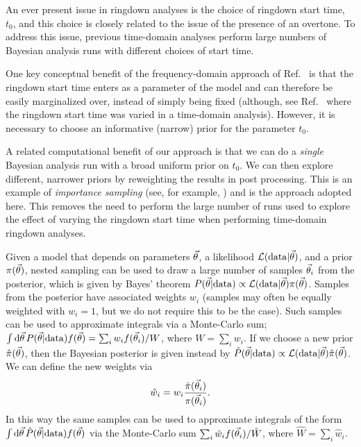 An ever present issue in ringdown analyses is the choice of ringdown start time, $t_0$, and this choice is closely related to the issue of the presence of an overtone.
To address this issue, previous time-domain analyses \cite{Isi:2019aib, Cotesta:2022pci, Isi:2022mhy} perform large numbers of Bayesian analysis runs with different choices of start time.

One key conceptual benefit of the frequency-domain approach of Ref.~\cite{Finch:2021qph} is that the ringdown start time enters as a parameter of the model and can therefore be easily marginalized over, instead of simply being fixed (although, see Ref.~\cite{Carullo:2019flw} where the ringdown start time was varied in a time-domain analysis). 
However, it is necessary to choose an informative (narrow) prior for the parameter $t_0$.

A related computational benefit of our approach is that we can do a \emph{single} Bayesian analysis run with a broad uniform prior on $t_0$. We can then explore different, narrower priors by reweighting the results in post processing. 
This is an example of \emph{importance sampling} (see, for example, \cite{RobertChristian2013MCsm}) and is the approach adopted here.
This removes the need to perform the large number of runs used to explore the effect of varying the ringdown start time when performing time-domain ringdown analyses.

Given a model that depends on parameters $\vec{\theta}$, a likelihood $\mathcal{L}(\mathrm{data}|\vec{\theta})$, and a prior $\pi(\vec{\theta})$, nested sampling can be used to draw a large number of samples $\vec{\theta}_i$ from the posterior, which is given by Bayes' theorem $P(\vec{\theta}|\mathrm{data})\propto \mathcal{L}(\mathrm{data}|\vec{\theta}) \pi(\vec{\theta})$.
Samples from the posterior have associated weights $w_i$ (samples may often be equally weighted with $w_i=1$, but we do not require this to be the case). 
Such samples can be used to approximate integrals via a Monte-Carlo sum; $\int \mathrm{d}\vec{\theta}\,P(\vec{\theta}|\mathrm{data})f(\vec{\theta})=\sum_{i}w_i f(\vec{\theta}_i)/W$, where $W=\sum_{i}w_i$.
If we choose a new prior $\hat{\pi}(\vec{\theta})$, then the Bayesian posterior is given instead by $\hat{P}(\vec{\theta}|\mathrm{data})\propto \mathcal{L}(\mathrm{data}|\vec{\theta}) \hat{\pi}(\vec{\theta})$.
We can define the new weights via
\begin{align}
	\hat{w}_i = w_i \frac{\hat{\pi}(\vec{\theta}_i)}{\pi(\vec{\theta}_i)}.
\end{align}
In this way the same samples can be used to approximate integrals of the form $\int \mathrm{d}\vec{\theta}\,\hat{P}(\vec{\theta}|\mathrm{data})f(\vec{\theta})$ via the Monte-Carlo sum $\sum_{i}\hat{w}_i f(\vec{\theta}_i)/\hat{W}$, where $\hat{W}=\sum_{i}\hat{w}_i$.

